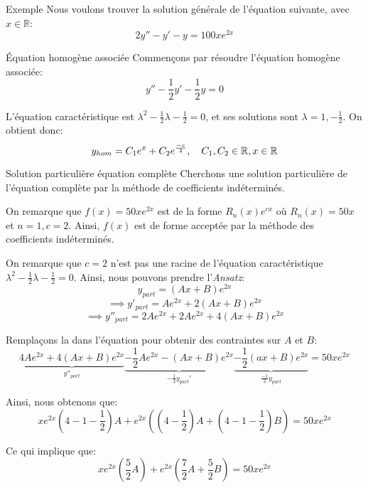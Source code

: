 \documentclass[a4paper]{article}
\begin{document}
\begin{parag}{Exemple}
    Nous voulons trouver la solution générale de l'équation suivante, avec $x \in \mathbb{R}$:
    \[2y'' - y' - y = 100x e^{2x}\]

    \begin{subparag}{Équation homogène associée}
        Commençons par résoudre l'équation homogène associée:
        \[y'' - \frac{1}{2} y' - \frac{1}{2}y = 0\]

        L'équation caractéristique est $\lambda^2 - \frac{1}{2}\lambda - \frac{1}{2} = 0$, et ses solutions sont $\lambda = 1, -\frac{1}{2}$. On obtient donc:
        \[y_{hom} = C_1 e^{x} + C_2 e^{\frac{-x}{2}}, \quad C_1, C_2 \in \mathbb{R}, x \in \mathbb{R}\]

    \end{subparag}

    \begin{subparag}{Solution particulière équation complète}
        Cherchons une solution particulière de l'équation complète par la méthode de coefficients indéterminés.

        On remarque que $f\left(x\right) = 50xe^{2x}$ est de la forme $R_n\left(x\right) e^{cx}$ où $R_n\left(x\right) = 50x$ et $n = 1, c = 2$. Ainsi, $f\left(x\right)$ est de forme acceptée par la méthode des coefficients indéterminés.

        On remarque que $c = 2$ n'est pas une racine de l'équation caractéristique $\lambda^2 - \frac{1}{2} \lambda - \frac{1}{2} = 0$. Ainsi, nous pouvons prendre l'\textit{Ansatz}:
        \[y_{part} = \left(Ax + B\right)e^{2x}\]
        \[\implies y'_{part} = Ae^{2x} + 2\left(Ax + B\right) e^{2x}\]
        \[\implies y''_{part} = 2Ae^{2x} + 2Ae^{2x} + 4\left(Ax + B\right) e^{2x}\]

        Remplaçons la dans l'équation pour obtenir des contraintes sur $A$ et $B$:
        \[\underbrace{4Ae^{2x} + 4\left(Ax + B\right) e^{2x}}_{y''_{part}} \underbrace{- \frac{1}{2} Ae^{2x} - \left(Ax + B\right) e^{2x}}_{-\frac{1}{2} y_{part}'} \underbrace{- \frac{1}{2}\left(ax + B\right)e^{2x}}_{\frac{-1}{2} y_{part}} = 50xe^{2x}\]

        Ainsi, nous obtenons que:
        \[xe^{2x} \left(4 - 1 - \frac{1}{2}\right)A + e^{2x} \left(\left(4 - \frac{1}{2}\right)A + \left(4 - 1 - \frac{1}{2}\right)B\right) = 50x e^{2x}\]

        Ce qui implique que:
        \[xe^{2x} \left(\frac{5}{2} A\right) + e^{2x} \left(\frac{7}{2}A + \frac{5}{2} B\right) = 50x e^{2x}\]



\end{subparag}
\end{parag}
\end{document}
